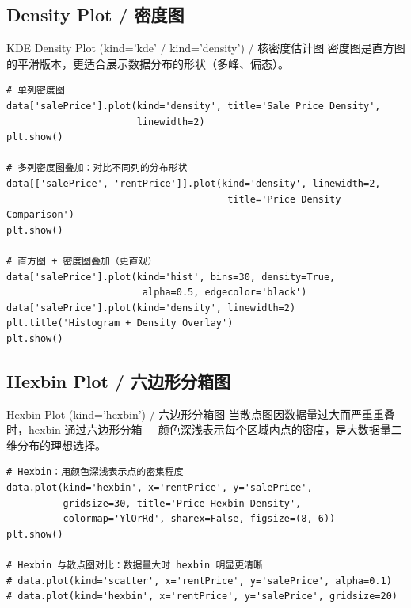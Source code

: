 \documentclass[11pt,a4paper]{report}
\begin{document}
\subsection{Density Plot / 密度图}

\begin{examplebox}{KDE Density Plot (kind='kde' / kind='density') / 核密度估计图}
    密度图是直方图的平滑版本，更适合展示数据分布的形状（多峰、偏态）。
\begin{lstlisting}
# 单列密度图
data['salePrice'].plot(kind='density', title='Sale Price Density',
                       linewidth=2)
plt.show()

# 多列密度图叠加：对比不同列的分布形状
data[['salePrice', 'rentPrice']].plot(kind='density', linewidth=2,
                                       title='Price Density Comparison')
plt.show()

# 直方图 + 密度图叠加（更直观）
data['salePrice'].plot(kind='hist', bins=30, density=True,
                        alpha=0.5, edgecolor='black')
data['salePrice'].plot(kind='density', linewidth=2)
plt.title('Histogram + Density Overlay')
plt.show()
\end{lstlisting}
\end{examplebox}

\subsection{Hexbin Plot / 六边形分箱图}

\begin{examplebox}{Hexbin Plot (kind='hexbin') / 六边形分箱图}
    当散点图因数据量过大而严重重叠时，hexbin 通过六边形分箱 + 颜色深浅表示每个区域内点的密度，是大数据量二维分布的理想选择。
\begin{lstlisting}
# Hexbin：用颜色深浅表示点的密集程度
data.plot(kind='hexbin', x='rentPrice', y='salePrice',
          gridsize=30, title='Price Hexbin Density',
          colormap='YlOrRd', sharex=False, figsize=(8, 6))
plt.show()

# Hexbin 与散点图对比：数据量大时 hexbin 明显更清晰
# data.plot(kind='scatter', x='rentPrice', y='salePrice', alpha=0.1)
# data.plot(kind='hexbin', x='rentPrice', y='salePrice', gridsize=20)
\end{lstlisting}
\end{examplebox}
\end{document}
